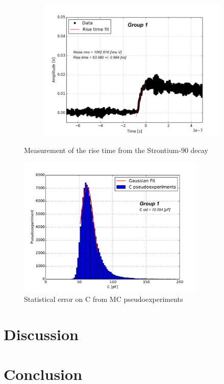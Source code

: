 \documentclass[12pt]{article}
\begin{document}
\begin{figure}[t!]
\begin{subfigure}[t]{0.45\textwidth}
  \end{subfigure}
  \hfill
  \begin{subfigure}[t]{0.45\textwidth}
    \centering
    \includegraphics[width=1.2\textwidth]{./graphics/data_11.png}
  \end{subfigure}
\caption{Measurement of the rise time from the Strontium-90 decay}
\label{fig:rise_time_measurement}
\end{figure}

\begin{figure}[htb]
  \centering
  \includegraphics[width=0.8\textwidth]{./graphics/stat_error_on_C_pseudoexperiments}
  \caption{Statistical error on C from MC pseudoexperiments}
  \label{fig:stat_error_on_C}
\end{figure}

\section{Discussion}
\section{Conclusion}
\end{document}

